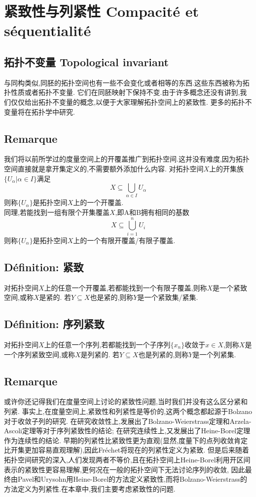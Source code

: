\documentclass[12pt, a4paper, oneside]{ctexbook}
\begin{document}
  \section{紧致性与列紧性 Compacité et séquentialité}
  \subsection{拓扑不变量 Topological invariant}
  与同构类似,同胚的拓扑空间也有一些不会变化或者相等的东西.这些东西被称为拓扑性质或者拓扑不变量.
  它们在同胚映射下保持不变.由于许多概念还没有讲到,我们仅仅给出拓扑不变量的概念,以便于大家理解拓扑空间上的紧致性.
  更多的拓扑不变量将在拓扑学中研究.
  \subsection{Remarque}
  我们将以前所学过的度量空间上的开覆盖推广到拓扑空间.这并没有难度,因为拓扑空间直接就是拿开集定义的,不需要额外添加什么内容.
  对拓扑空间$X$上的开集族$\{U_\alpha|\alpha\in I \}$满足
  $$
    X\subseteq \bigcup_{\alpha\in I}U_\alpha
  $$则称$\{U_\alpha\}$是拓扑空间$X$上的一个开覆盖.\\

  同理,若能找到一组有限个开集覆盖$X$,即A和B拥有相同的基数
  $$
  X\subseteq \bigcup_{i=1}^{n}U_i
  $$则称$\{U_\alpha\}$是拓扑空间$X$上的一个有限开覆盖/有限子覆盖.
  \subsection{Définition: 紧致}
  对拓扑空间$X$上的任意一个开覆盖,若都能找到一个有限子覆盖,则称$X$是一个紧致空间,或称$X$是紧的.
  若$Y\subseteq X$也是紧的,则称$Y$是一个紧致集/紧集.
  \subsection{Définition: 序列紧致}
  对拓扑空间$X$上的任意一个序列,若都能找到一个子序列$\{ x_n\}$收敛于$x\in X$,则称$X$是一个序列紧致空间,或称$X$是列紧的.
  若$Y\subseteq X$也是列紧的,则称$Y$是一个列紧集.
  \subsection{Remarque}
  或许你还记得我们在度量空间上讨论的紧致性问题,当时我们并没有这么区分紧和列紧.
  事实上,在度量空间上,紧致性和列紧性是等价的,这两个概念都起源于Bolzano对于收敛子列的研究.
  在研究收敛性上,发展出了Bolzano-Weierstrass定理和Arzela-Ascoli定理等对于序列紧致性的结论;
  在研究连续性上,又发展出了Heine-Borel定理作为连续性的结论.
  早期的列紧性比紧致性更为直观(显然,度量下的点列收敛肯定比开集更加容易直观理解),因此Fréchet将现在的列紧性定义为紧致.
  但是后来随着拓扑空间研究的深入,人们发现两者不等价,且在拓扑空间上Heine-Borel利用开区间表示的紧致性更容易理解,更何况在一般的拓扑空间下无法讨论序列的收敛,
  因此最终由Pavel和Urysohn用Heine-Borel的方法定义紧致性,而将Bolzano-Weierstrass的方法定义为列紧性.在本章中,我们主要考虑紧致性的问题.
\end{document}
